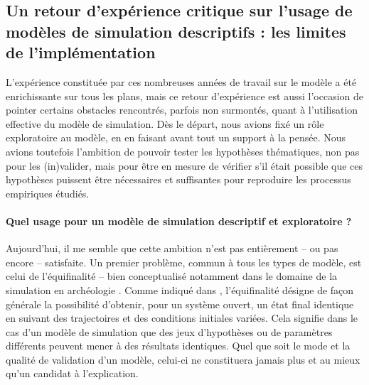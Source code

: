 \subsection{Un retour d'expérience critique sur l'usage de modèles de simulation descriptifs : les limites de l'implémentation}

L'expérience constituée par ces nombreuses années de travail sur le modèle \simfeodal{} a été enrichissante sur tous les plans, mais ce retour d'expérience est aussi l'occasion de pointer certains obstacles rencontrés, parfois non surmontés, quant à l'utilisation effective du modèle de simulation.
Dès le départ, nous avions fixé un rôle exploratoire au modèle, en en faisant avant tout un support à la pensée.
Nous avions toutefois l'ambition de pouvoir tester les hypothèses thématiques, non pas pour les (in)valider, mais pour être en mesure de vérifier s'il était possible que ces hypothèses puissent être nécessaires et suffisantes pour reproduire les processus empiriques étudiés.

\paragraph{Quel usage pour un modèle de simulation descriptif et exploratoire ?}

Aujourd'hui, il me semble que cette ambition n'est pas entièrement -- ou pas encore -- satisfaite.
Un premier problème, commun à tous les types de modèle, est celui de l'équifinalité -- bien conceptualisé notamment dans le domaine de la simulation en archéologie \autocite{premo_equifinality_2010}.
Comme indiqué dans \textcite[415]{reycoyrehourcq:hal-01677950}, l'équifinalité
	\og désigne de façon générale la possibilité d'obtenir, pour un système ouvert, un état final identique en suivant des trajectoires et des conditions initiales variées.
	Cela signifie dans le cas d'un modèle de simulation que des jeux d'hypothèses ou de paramètres différents peuvent mener à des résultats identiques\fg{}.
Quel que soit le mode et la qualité de \og validation\fg{} d'un modèle, celui-ci ne constituera jamais plus et au mieux qu'un \og candidat à l'explication\fg{}.

